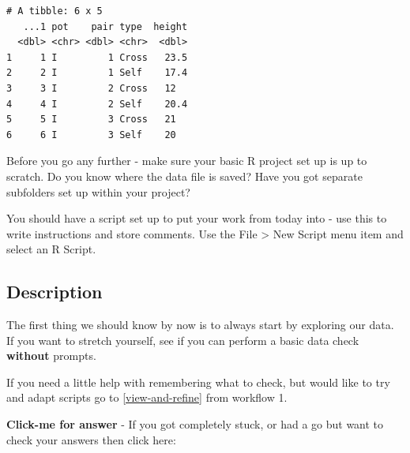 \documentclass[
]{book}
\makeatletter
\newenvironment{kframe}{%
\medskip{}
\setlength{\fboxsep}{.8em}
 \def\at@end@of@kframe{}%
 \ifinner\ifhmode%
  \def\at@end@of@kframe{\end{minipage}}%
  \begin{minipage}{\columnwidth}%
 \fi\fi%
 \def\FrameCommand##1{\hskip\@totalleftmargin \hskip-\fboxsep
 \colorbox{shadecolor}{##1}\hskip-\fboxsep
     \hskip-\linewidth \hskip-\@totalleftmargin \hskip\columnwidth}%
 \MakeFramed {\advance\hsize-\width
   \@totalleftmargin\z@ \linewidth\hsize
   \@setminipage}}%
 {\par\unskip\endMakeFramed%
 \at@end@of@kframe}
\newenvironment{block}[1]
  {
  \begin{itemize}
  \renewcommand{\labelitemi}{
    \raisebox{-.7\height}[0pt][0pt]{
      {\setkeys{Gin}{width=3em,keepaspectratio}\texttt{[image: images/\#1]}}
    }
  }
  \setlength{\fboxsep}{1em}
  \begin{kframe}
  \item
  }
  {
  \end{kframe}
  \end{itemize}
  }
\newenvironment{rmdwarning}
  {\begin{block}{warning}}
  {\end{block}}
\makeatother
\begin{document}
\begin{verbatim}
# A tibble: 6 x 5
   ...1 pot    pair type  height
  <dbl> <chr> <dbl> <chr>  <dbl>
1     1 I         1 Cross   23.5
2     2 I         1 Self    17.4
3     3 I         2 Cross   12  
4     4 I         2 Self    20.4
5     5 I         3 Cross   21  
6     6 I         3 Self    20 
\end{verbatim}

\begin{rmdwarning}
Before you go any further - make sure your basic R project set up is up
to scratch. Do you know where the data file is saved? Have you got
separate subfolders set up within your project?

You should have a script set up to put your work from today into - use
this to write instructions and store comments. Use the File
\textgreater{} New Script menu item and select an R Script.
\end{rmdwarning}

\hypertarget{description}{%
\subsection{Description}\label{description}}

The first thing we should know by now is to always start by exploring our data. If you want to stretch yourself, see if you can perform a basic data check \textbf{without} prompts.

If you need a little help with remembering what to check, but would like to try and adapt scripts go to \ref{view-and-refine} from workflow 1.

\textbf{Click-me for answer} - If you got completely stuck, or had a go but want to check your answers then click here:
\end{document}
